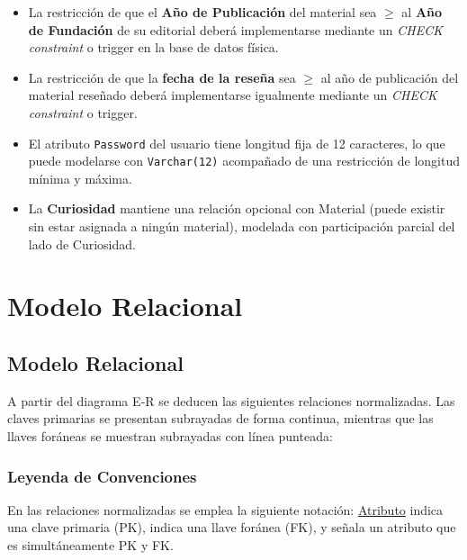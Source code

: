 \documentclass[12pt,a4paper]{article}
\begin{document}
\begin{itemize}
    \item La restricción de que el \textbf{Año de Publicación} del material sea $\geq$ al \textbf{Año de Fundación} de su editorial deberá implementarse mediante un \textit{CHECK constraint} o trigger en la base de datos física.

    \item La restricción de que la \textbf{fecha de la reseña} sea $\geq$ al año de publicación del material reseñado deberá implementarse igualmente mediante un \textit{CHECK constraint} o trigger.

    \item El atributo \texttt{Password} del usuario tiene longitud fija de 12 caracteres, lo que puede modelarse con \texttt{Varchar(12)} acompañado de una restricción de longitud mínima y máxima.

    \item La \textbf{Curiosidad} mantiene una relación opcional con Material (puede existir sin estar asignada a ningún material), modelada con participación parcial del lado de Curiosidad.
\end{itemize}
\section{Modelo Relacional}

\subsection{Modelo Relacional}

A partir del diagrama E‑R se deducen las siguientes relaciones normalizadas. Las claves primarias se presentan subrayadas de forma continua, mientras que las llaves foráneas se muestran subrayadas con línea punteada:

\subsubsection*{Leyenda de Convenciones}
En las relaciones normalizadas se emplea la siguiente notación:
\uline{Atributo} indica una clave primaria (PK),
 indica una llave foránea (FK),
y \uline{} señala un atributo que es simultáneamente PK y FK. \\
\end{document}
